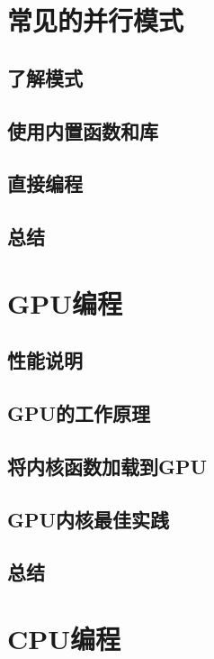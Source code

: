 \documentclass[11pt,a4paper,UTF8]{ctexart}
\begin{document}
	\section{常见的并行模式}
	
		\subsection{了解模式}
		
		\subsection{使用内置函数和库}
		
		\subsection{直接编程}
		
		\subsection{总结}
		
	\section{GPU编程}
	
		\subsection{性能说明}
		
		\subsection{GPU的工作原理}
		
		\subsection{将内核函数加载到GPU}
		
		\subsection{GPU内核最佳实践}
		
		\subsection{总结}
		
	\section{CPU编程}
	
\end{document}
